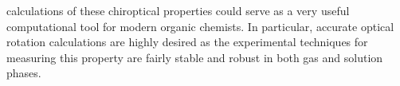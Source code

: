 calculations of these chiroptical properties could serve as a very useful computational tool for 
modern organic chemists. In particular, accurate optical rotation calculations are highly desired 
as the experimental techniques for measuring this property are fairly stable and robust in 
both gas and solution phases.
\\
